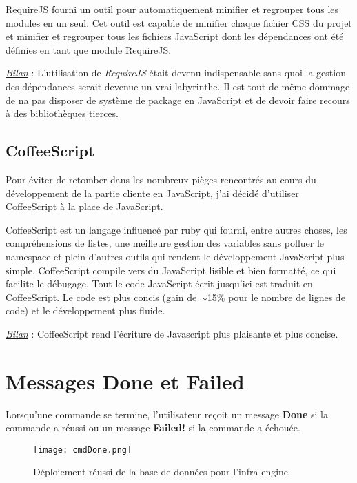 RequireJS fourni un outil pour automatiquement minifier et
regrouper tous les modules en un seul. Cet outil est capable de minifier chaque
fichier CSS du projet et minifier et regrouper tous les fichiers JavaScript dont
les dépendances ont été définies en tant que module RequireJS.

\underline{\textit{Bilan}} : L'utilisation de \textit{RequireJS} était devenu
indispensable sans quoi la gestion des dépendances serait devenue un vrai
labyrinthe. Il est tout de même dommage de na pas disposer de système de package
en JavaScript et de devoir faire recours à des bibliothèques tierces.

\subsection{CoffeeScript}

Pour éviter de retomber dans les nombreux pièges rencontrés au cours du
développement de la partie cliente en JavaScript, j'ai décidé d'utiliser
CoffeeScript à la place de JavaScript.

CoffeeScript est un langage influencé par ruby qui fourni, entre autres choses,
les compréhensions de listes, une meilleure gestion des variables sans polluer
le namespace et plein d'autres outils qui rendent le développement JavaScript
plus simple. CoffeeScript compile vers du JavaScript lisible et bien formatté,
ce qui facilite le débugage.
Tout le code JavaScript écrit jusqu'ici est traduit en CoffeeScript.
Le code est plus concis (gain de $\sim$15\% pour le nombre de lignes de code) et le
développement plus fluide.

\underline{\textit{Bilan}} : CoffeeScript rend l'écriture de Javascript plus
plaisante et plus concise.

\section{Messages Done et Failed}

Lorsqu'une commande se termine, l'utilisateur reçoit un message \textbf{Done} si la
commande a réussi ou un message \textbf{Failed!} si la commande a échouée.

\begin{figure}[H]
  \texttt{[image: cmdDone.png]}
  \caption{Déploiement réussi de la base de données pour l'infra engine}
\end{figure}

